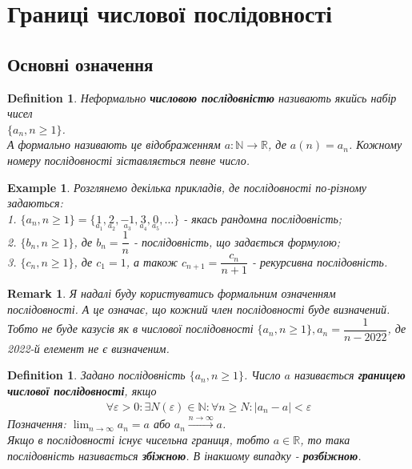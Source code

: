 \documentclass[a4paper, 14pt]{article}
\theoremstyle{theoremdd}
\theoremstyle{theoremdd}
\newtheorem{definition}[theorem]{Definition}
\theoremstyle{theoremdd}
\theoremstyle{theoremdd}
\newtheorem{example}[theorem]{Example}
\theoremstyle{theoremdd}
\theoremstyle{theoremdd}
\newtheorem{remark}[theorem]{Remark}
\theoremstyle{theoremdd}
\theoremstyle{theoremdd}
\begin{document}
	\section{Границі числової послідовності}
	\subsection{Основні означення}
	\begin{definition}
	Неформально \textbf{числовою послідовністю} називають якийсь набір чисел  \\ $\{a_n, n \geq 1\}$.\\
	А формально називають це відображенням $a: \mathbb{N} \to \mathbb{R}$, де $a(n) = a_n$. Кожному номеру послідовності зіставляється певне число.
	\end{definition}
	
	\begin{example}
	Розглянемо декілька прикладів, де послідовності по-різному задаються:\\
	1. $\{a_n, n \geq 1\} = \{\underset{a_1}{1},\underset{a_2}{2},\underset{a_3}{-1},\underset{a_4}{3},\underset{a_5}{0},\dots\}$ - якась рандомна послідовність;\\
	2. $\{b_n, n \geq 1\}$, де $b_n = \dfrac{1}{n}$ - послідовність, що задається формулою;\\
	3. $\{c_n, n \geq 1\}$, де $c_1 = 1$, а також $c_{n+1} = \dfrac{c_n}{n+1}$ - рекурсивна послідовність.
	\end{example}
	
	\begin{remark}
	Я надалі буду користуватись формальним означенням послідовності. А це означає, що кожний член послідовності буде визначений. Тобто не буде казусів як в числової послідовності $\{a_n, n \geq 1\}, a_n = \dfrac{1}{n-2022}$, де 2022-й елемент не є визначеним.
	\end{remark}
	
	\begin{definition} Задано послідовність $\{a_n, n \geq 1\}$.
	Число $a$ називається \textbf{границею числової послідовності}, якщо
	\begin{align*}
	\forall \varepsilon > 0: \exists N(\varepsilon) \in \mathbb{N}: \forall n \geq N: |a_n - a| < \varepsilon
	\end{align*}
	Позначення: $\displaystyle \lim_{n \to \infty} a_n = a$ або $a_n \overset{n \to \infty}{\longrightarrow} a$.\\
	Якщо в послідовності існує чисельна границя, тобто $a \in \mathbb{R}$, то така послідовність називається \textbf{збіжною}. В інакшому випадку - \textbf{розбіжною}.
	\end{definition}
	
\end{document}
